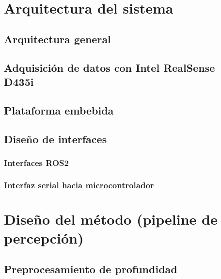 \chapter{Arquitectura del sistema}

\section{Arquitectura general}

\section{Adquisición de datos con Intel RealSense D435i}

\section{Plataforma embebida}

\section{Diseño de interfaces}
\subsection{Interfaces ROS2}

\subsection{Interfaz serial hacia microcontrolador}

\chapter{Diseño del método (pipeline de percepción)}

\section{Preprocesamiento de profundidad}

